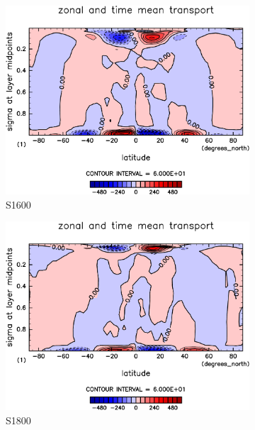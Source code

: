 \documentclass[body]{subfiles}
\begin{document}
\begin{figure}[t]
	\begin{subfigure}{.4\textwidth}
		\centering
		\includegraphics[width=\textwidth]{S1600/MeriHeatTransTest@dryStatEn_M,time=3650:4015-crop-rotate.pdf}
		\caption{S1600}\label{乾燥静的エネルギー平均子午面循環S1600}
	\end{subfigure}
	\begin{subfigure}{.4\textwidth}
		\centering
		\includegraphics[width=\textwidth]{S1800/MeriHeatTransTest@dryStatEn_M,time=3650:4015-crop-rotate.pdf}
		\caption{S1800}\label{乾燥静的エネルギー平均子午面循環S1800}
	\end{subfigure}
	\begin{subfigure}{.4\textwidth}

\end{subfigure}
\end{figure}
\end{document}
